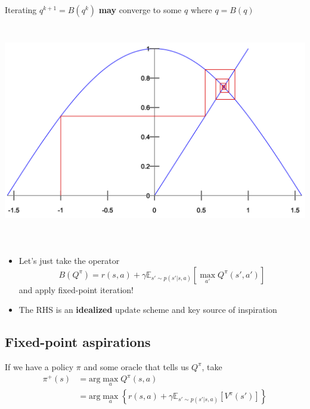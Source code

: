 \documentclass[
  letterpaper,
  DIV=11,
  numbers=noendperiod,
  oneside]{scrartcl}
\begin{document}
Iterating \(q^{k+1} = B(q^k)\) \textbf{may} converge to some \(q\) where
\(q = B(q)\)

\begin{center}
\includegraphics[width=\textwidth,height=3.64583in]{figs/fixedpoint.png}
\end{center}

\subsection{}\label{section-8}

\begin{itemize}
\item
  Let's just take the operator
  \[B(Q^\pi) = r(s,a) + \gamma  \mathbb{E}_{s' \sim p(s' | s, a)}\left[ \max_{a'} Q^\pi (s',a') \right]\]
  and apply fixed-point iteration!
\item
  The RHS is an \textbf{idealized} update scheme and key source of
  inspiration
\end{itemize}

\subsection{Fixed-point aspirations}\label{fixed-point-aspirations}

If we have a policy \(\pi\) and some oracle that tells us \(Q^\pi\),
take \begin{align}
\pi^{+}(s) &= \text{arg}\max\limits_{a} Q^\pi (s,a) \\
&= \text{arg}\max\limits_{a} \left\{ r(s,a) + \gamma \mathbb{E}_{s' \sim p(s' | s, a)} \left[ V^\pi  (s') \right] \right\}
\end{align}
\end{document}
